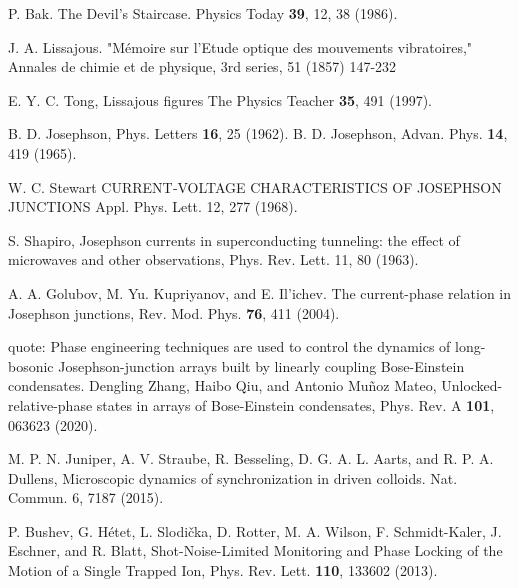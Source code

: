 \documentclass[twocolumn,preprintnumbers,amsmath,amssymb,aps,prx]{revtex4}
\begin{document}
\begin{thebibliography}{99}
     P. Bak. The Devil's Staircase. Physics Today {\bf 39}, 12, 38 (1986).

     J. A. Lissajous.  "Mémoire sur l'Etude optique des mouvements vibratoires,"  Annales de chimie et de physique, 3rd series, 51 (1857) 147-232

     E. Y. C. Tong, Lissajous figures The Physics Teacher {\bf 35}, 491 (1997).

     B. D. Josephson, Phys. Letters {\bf 16}, 25 (1962). 
     B. D. Josephson, Advan. Phys. {\bf 14}, 419 (1965).

      W. C. Stewart CURRENT‐VOLTAGE CHARACTERISTICS OF JOSEPHSON JUNCTIONS Appl. Phys. Lett. 12, 277 (1968).
      
     S. Shapiro, Josephson currents in superconducting tunneling: the effect of microwaves and other observations, Phys. Rev. Lett. 11, 80 (1963).

     A. A. Golubov, M. Yu. Kupriyanov, and E. Il’ichev. The current-phase relation in Josephson junctions, Rev. Mod. Phys. {\bf 76}, 411 (2004).

      quote: Phase engineering techniques are used to control the dynamics of long-bosonic Josephson-junction arrays built by linearly coupling Bose-Einstein condensates.
     Dengling Zhang, Haibo Qiu, and Antonio Muñoz Mateo, Unlocked-relative-phase states in arrays of Bose-Einstein condensates, Phys. Rev. A {\bf 101}, 063623 (2020).


      
     M. P. N. Juniper, A. V. Straube, R. Besseling, D. G. A. L. Aarts, and R. P. A. Dullens, Microscopic dynamics of synchronization in driven colloids. Nat. Commun. 6, 7187 (2015).

     P. Bushev, G. Hétet, L. Slodička, D. Rotter, M. A. Wilson, F. Schmidt-Kaler, J. Eschner, and R. Blatt, Shot-Noise-Limited Monitoring and Phase Locking of the Motion of a Single Trapped Ion, Phys. Rev. Lett. {\bf 110}, 133602 (2013).


\end{thebibliography}
\end{document}
